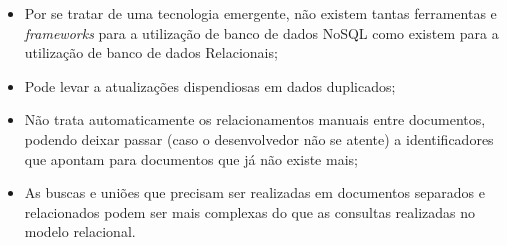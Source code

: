 \begin{itemize}
    \item Por se tratar de uma tecnologia emergente, não existem tantas ferramentas e \textit{frameworks} para a utilização de banco de dados NoSQL como existem para a utilização de banco de dados Relacionais;
    
    \item Pode levar a atualizações dispendiosas em dados duplicados;
    
    
    \item Não trata automaticamente os relacionamentos manuais entre documentos, podendo deixar passar (caso o desenvolvedor não se atente) a identificadores que apontam para documentos que já não existe mais;
    
    \item As buscas e uniões que precisam ser realizadas em documentos separados e relacionados podem ser mais complexas do que as consultas realizadas no modelo relacional.
\end{itemize}




